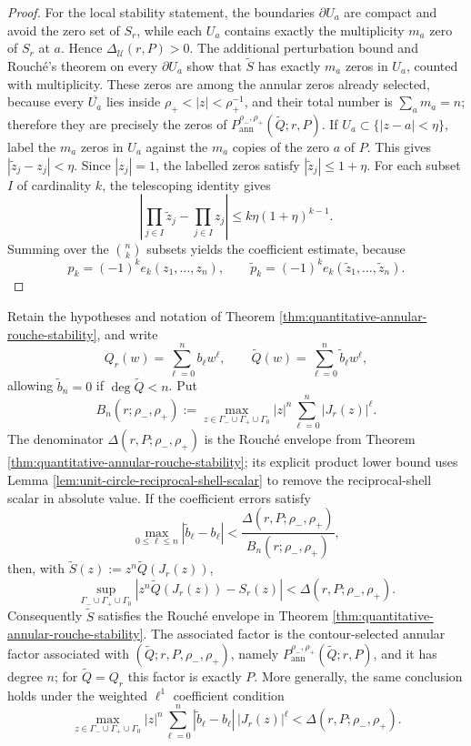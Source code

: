 \begin{proof}
For the local stability statement, the boundaries \(\partial U_a\) are compact and avoid the zero set of \(S_r\), while each \(U_a\) contains exactly the multiplicity \(m_a\) zero of \(S_r\) at \(a\).  Hence \(\Delta_{\mathcal U}(r,P)>0\).  The additional perturbation bound and Rouch\'e's theorem on every \(\partial U_a\) show that \(\widetilde S\) has exactly \(m_a\) zeros in \(U_a\), counted with multiplicity.  These zeros are among the annular zeros already selected, because every \(\overline{U_a}\) lies inside \(\rho_+<|z|<\rho_+^{-1}\), and their total number is \(\sum_a m_a=n\); therefore they are precisely the zeros of \(P_{\mathrm{ann}}^{\rho_-,\rho_+}(\widetilde Q;r,P)\).  If \(U_a\subset\{|z-a|<\eta\}\), label the \(m_a\) zeros in \(U_a\) against the \(m_a\) copies of the zero \(a\) of \(P\).  This gives \(|\widetilde z_j-z_j|<\eta\).  Since \(|z_j|=1\), the labelled zeros satisfy \(|\widetilde z_j|\le1+\eta\).  For each subset \(I\) of cardinality \(k\), the telescoping identity gives
\[
\left|\prod_{j\in I}\widetilde z_j-
\prod_{j\in I}z_j\right|
\le k\eta(1+\eta)^{k-1}.
\]
Summing over the \(\binom nk\) subsets yields the coefficient estimate, because
\[
p_k=(-1)^ke_k(z_1,
\dots,z_n),\qquad
\widetilde p_k=(-1)^ke_k(\widetilde z_1,
\dots,
\widetilde z_n).
\]
\end{proof}

\begin{corollary}\label{cor:coefficient-annular-stability}
Retain the hypotheses and notation of Theorem \ref{thm:quantitative-annular-rouche-stability}, and write
\[
Q_r(w)=\sum_{\ell=0}^{n}b_\ell w^\ell,
\qquad
\widetilde Q(w)=\sum_{\ell=0}^{n}\widetilde b_\ell w^\ell,
\]
allowing \(\widetilde b_n=0\) if \(\deg\widetilde Q<n\).  Put
\[
B_n(r;\rho_-,\rho_+)
:=
\max_{z\in\Gamma_-\cup\Gamma_+\cup\Gamma_0}
|z|^n\sum_{\ell=0}^{n}|J_r(z)|^\ell.
\]
The denominator \(\Delta(r,P;\rho_-,\rho_+)\) is the Rouch\'e envelope
from Theorem \ref{thm:quantitative-annular-rouche-stability}; its
explicit product lower bound uses Lemma
\ref{lem:unit-circle-reciprocal-shell-scalar} to remove the
reciprocal-shell scalar in absolute value.
If the coefficient errors satisfy
\[
\max_{0\le \ell\le n}|\widetilde b_\ell-b_\ell|
<
\frac{\Delta(r,P;\rho_-,\rho_+)}{B_n(r;\rho_-,\rho_+)},
\]
then, with \(\widetilde S(z):=z^n\widetilde Q(J_r(z))\),
\[
\sup_{\Gamma_-\cup\Gamma_+\cup\Gamma_0}
\left|z^n\widetilde Q(J_r(z))-S_r(z)\right|
<\Delta(r,P;\rho_-,\rho_+).
\]
Consequently \(\widetilde S\) satisfies the Rouch\'e envelope in Theorem
\ref{thm:quantitative-annular-rouche-stability}.  The associated
factor is the contour-selected annular factor associated with
\((\widetilde Q;r,P,\rho_-,\rho_+)\), namely
\(P_{\mathrm{ann}}^{\rho_-,\rho_+}(\widetilde Q;r,P)\), and it has
degree \(n\); for \(\widetilde Q=Q_r\) this factor is exactly \(P\).
More generally, the same conclusion holds under the weighted \(\ell^1\)
coefficient condition
\[
\max_{z\in\Gamma_-\cup\Gamma_+\cup\Gamma_0}
|z|^n\sum_{\ell=0}^{n}|\widetilde b_\ell-b_\ell|\,|J_r(z)|^\ell
<\Delta(r,P;\rho_-,\rho_+).
\]
\end{corollary}

